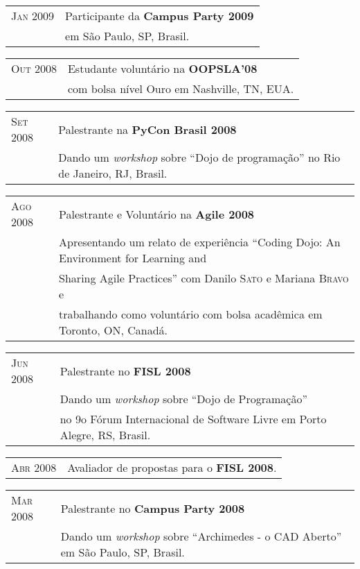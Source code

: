 \documentclass[letter,10pt]{article}
\begin{document}
\begin{tabular}{p{2.5cm}l}
  \textsc{Jan 2009} & Participante da \textbf{Campus Party 2009}\\
  &em São Paulo, SP, Brasil.\\
\end{tabular}

\begin{tabular}{p{2.5cm}l}
  \textsc{Out 2008} & Estudante voluntário na \textbf{OOPSLA'08}\\
  & com bolsa nível Ouro em Nashville, TN, EUA.\\
\end{tabular}

\begin{tabular}{p{2.5cm}l}
  \textsc{Set 2008} & Palestrante na \textbf{PyCon Brasil 2008}\\
  & Dando um \textit{workshop} sobre ``Dojo de programação'' no Rio de Janeiro, RJ, Brasil.\\
\end{tabular}

\begin{tabular}{p{2.5cm}l}
  \textsc{Ago 2008} & Palestrante e Voluntário na \textbf{Agile 2008}\\
  &Apresentando um relato de experiência ``Coding Dojo: An Environment for
  Learning and\\
  & Sharing Agile Practices'' com Danilo \textsc{Sato} e Mariana \textsc{Bravo} e\\
  & trabalhando como voluntário com bolsa acadêmica em Toronto, ON, Canadá.\\
\end{tabular}

\begin{tabular}{p{2.5cm}l}
  \textsc{Jun 2008} & Palestrante no \textbf{FISL 2008}\\
  &Dando um \textit{workshop} sobre ``Dojo de Programação''\\
  & no 9o Fórum Internacional de Software Livre em Porto
  Alegre, RS, Brasil.\\
\end{tabular}

\begin{tabular}{p{2.5cm}l}
  \textsc{Abr 2008} & Avaliador de propostas para o \textbf{FISL 2008}.\\
\end{tabular}

\begin{tabular}{p{2.5cm}l}
  \textsc{Mar 2008} & Palestrante no \textbf{Campus Party 2008}\\
  &Dando um \textit{workshop} sobre ``Archimedes - o CAD Aberto'' em São Paulo, SP, Brasil.\\
\end{tabular}
\end{document}
